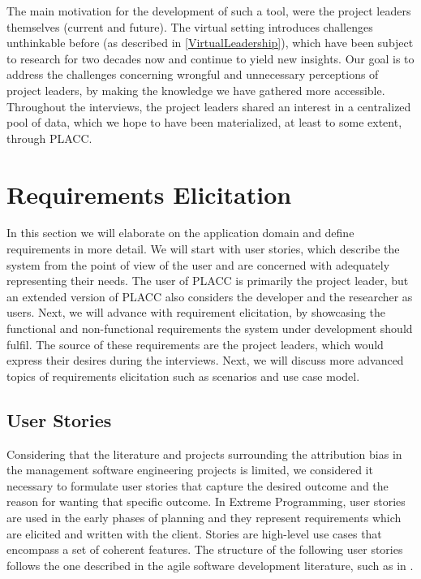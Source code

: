 The main motivation for the development of such a tool, were the project leaders themselves (current and future). The virtual setting introduces challenges unthinkable before (as described in \ref{VirtualLeadership}),  which have been subject to research for two decades now and continue to yield new insights. Our goal is to address the challenges concerning wrongful and unnecessary perceptions of project leaders, by making the knowledge we have gathered more accessible. Throughout the interviews, the project leaders shared an interest in a centralized pool of data, which we hope to have been materialized, at least to some extent, through PLACC.

\section{Requirements Elicitation} \label{Requirements}

In this section we will elaborate on the application domain and define requirements in more detail. We will start with user stories, which describe the system from the point of view of the user and are concerned with adequately representing their needs. The user of PLACC is primarily the project leader, but an extended version of PLACC also considers the developer and the researcher as users. Next, we will advance with requirement elicitation, by showcasing the functional and non-functional requirements the system under development should fulfil. The source of these requirements are the project leaders, which would express their desires during the interviews.  Next, we will discuss more advanced topics of requirements elicitation such as scenarios and use case model. 

\subsection{User Stories}

Considering that the literature and projects surrounding the attribution bias in the management software engineering projects is limited, we considered it necessary to formulate user stories that capture the desired outcome and the reason for wanting that specific outcome.  In Extreme Programming, user stories are used in the early phases of planning and they represent requirements which are elicited and written with the client.  Stories are high-level use cases that encompass a set of coherent features.  The structure of the following user stories follows the one described in the agile software development literature, such as in \cite{Cohn2004}.  

